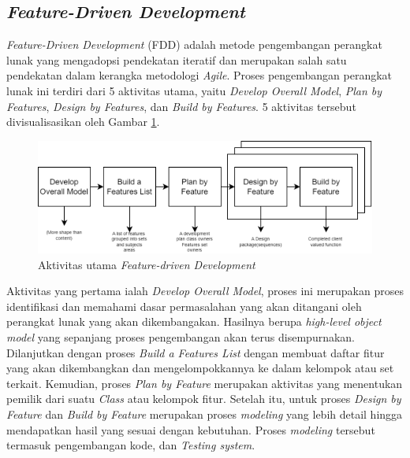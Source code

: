 \subsection{\textit{Feature-Driven Development}}
\textit{Feature-Driven Development} (FDD) adalah metode pengembangan perangkat lunak yang mengadopsi pendekatan iteratif dan merupakan salah satu pendekatan dalam kerangka metodologi \textit{Agile}.
Proses pengembangan perangkat lunak ini terdiri dari 5 aktivitas utama, yaitu \textit{Develop Overall Model}, \textit{Plan by Features}, \textit{Design by Features}, dan \textit{Build by Features}.
5 aktivitas tersebut divisualisasikan oleh Gambar \ref*{Fig:FDD-langkah}.
\begin{figure}[H]
	\centering
	\includegraphics[width=\textwidth]{contents/chapter-2/images/FDD.png}
	\caption{Aktivitas utama \textit{Feature-driven Development}\cite{palmer2001practical}}
	\label{Fig:FDD-langkah}
\end{figure}
Aktivitas yang pertama ialah \textit{Develop Overall Model}, proses ini merupakan proses identifikasi dan memahami dasar permasalahan yang akan ditangani oleh perangkat lunak yang akan dikembangakan.
Hasilnya berupa \textit{high-level object model} yang sepanjang proses pengembangan akan terus disempurnakan. Dilanjutkan dengan proses \textit{Build a Features List} dengan membuat daftar fitur yang akan dikembangkan dan mengelompokkannya ke dalam kelompok atau set terkait.
Kemudian, proses \textit{Plan by Feature} merupakan aktivitas yang menentukan pemilik dari suatu \textit{Class} atau kelompok fitur.
Setelah itu, untuk proses \textit{Design by Feature} dan \textit{Build by Feature} merupakan proses \textit{modeling} yang lebih detail hingga mendapatkan hasil yang sesuai dengan kebutuhan.
Proses \textit{modeling} tersebut termasuk pengembangan kode, dan \textit{Testing system}.
